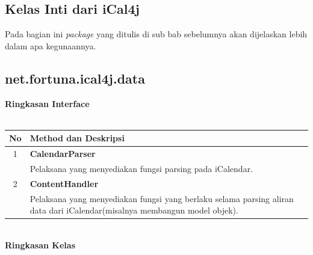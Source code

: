 \subsection{Kelas Inti dari iCal4j}
Pada bagian ini \textit{package} yang ditulis di sub bab sebelumnya akan dijelaskan lebih dalam apa kegunaannya.\cite{ical}

\subsection{net.fortuna.ical4j.data}

\noindent \textbf{Ringkasan Interface}\\ \\
	\begin{tabular}{|c|p{12cm}|}
		\hline
		\textbf{No} & \textbf{Method dan Deskripsi} \\ \hline \hline
		1 & \textbf{CalendarParser}\\
			&	Pelaksana yang menyediakan fungsi parsing pada iCalendar.\\ \hline
		2 & \textbf{ContentHandler}\\
			&	Pelaksana yang menyediakan fungsi yang berlaku selama parsing aliran data dari iCalendar(misalnya membangun model objek).\\ \hline
	\end{tabular}
	\\ 
	\noindent \textbf{Ringkasan Kelas}\\ \\
